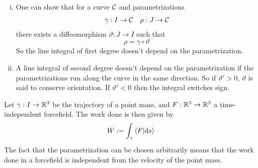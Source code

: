 \documentclass[../../script.tex]{subfiles}
\begin{document}
\begin{rem}
    \begin{enumerate}[(i)]
        \item One can show that for a curve $\mathcal{C}$ and parametrizations
        \begin{align*}
            \gamma: I \rightarrow \mathcal{C} && \rho: J \rightarrow \mathcal{C}
        \end{align*}
        there exists a diffeomorphism $\vartheta: J \rightarrow I$ such that 
        \[
            \rho = \gamma \circ \vartheta
        \]
        So the line integral of first degree doesn't depend on the parametrization.

        \item A line integral of second degree doesn't depend on the parametrization if the parametrizations run along the curve in the same direction.
        So if $\vartheta' > 0$, $\vartheta$ is said to conserve orientation. If $\vartheta' < 0$ then the integral switches sign.
    \end{enumerate}
\end{rem}

\begin{eg}
    Let $\gamma: I \rightarrow \mathbb{R}^3$ be the trajectory of a point mass, and $F: \mathbb{R}^3 \rightarrow \mathbb{R}^3$ a time-independent forcefield.
    The work done is then given by 
    \[
        W := \int_{\gamma} \innerproduct{F}{\dd{s}}
    \]
    The fact that the parametrization can be chosen arbitrarily means that the work done in a forcefield is independent from the velocity of the point mass.
\end{eg}
\end{document}
